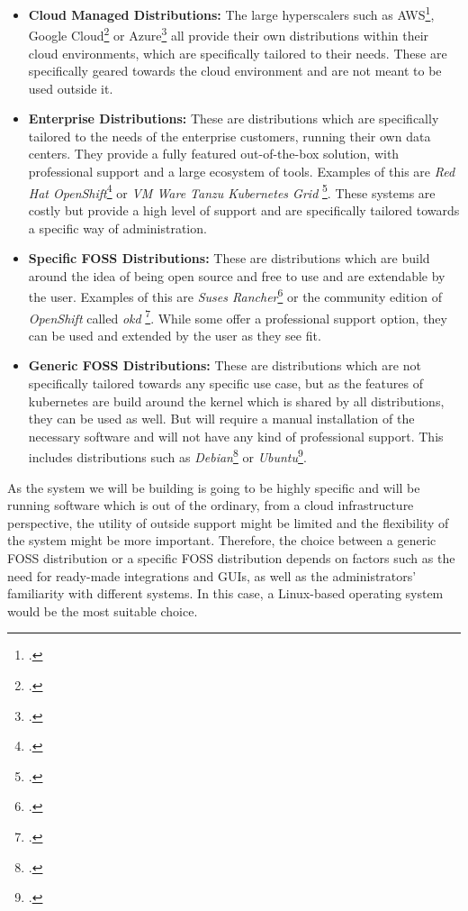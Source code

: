 \begin{itemize}
    \item \textbf{Cloud Managed Distributions:} The large hyperscalers such as AWS\footcite{awsOpenSourceKubernetesVerteilungAmazonEKSVerteilungAmazon}, Google Cloud\footcite{googleNodeImagesGoogle}
          or Azure\footcite{burtMicrosoftAzureLinux} all provide their own distributions within their cloud environments, which are specifically tailored to their needs.
          These are specifically geared towards the cloud environment and are not meant to be used outside it.
    \item \textbf{Enterprise Distributions:} These are distributions which are specifically tailored to the needs of the enterprise customers,
          running their own data centers. They provide a fully featured out-of-the-box solution, with professional support and a large ecosystem of tools.
          Examples of this are \textit{Red Hat OpenShift}\footcite{redhatRedHatOpenShift} or \textit{VM Ware Tanzu Kubernetes Grid} \footcite{vmwareVMwareTanzuKubernetes2020}.
          These systems are costly but provide a high level of support and are specifically tailored towards a specific way of administration.
    \item \textbf{Specific \ac{FOSS} Distributions:} These are distributions which are build around the idea of being open source and free to use
          and are extendable by the user. Examples of this are \textit{Suses Rancher}\footcite{rancherInnovateEverywhere} or the community edition of \textit{OpenShift} called \textit{okd} \footcite{innesOKDIo}.
          While some offer a professional support option, they can be used and extended by the user as they see fit.
    \item \textbf{Generic \ac{FOSS} Distributions:} These are distributions which are not specifically tailored towards any specific use case, but as the features of
          kubernetes are build around the kernel which is shared by all distributions, they can be used as well.
          But will require a manual installation of the necessary software and will not have any kind of professional support. This includes distributions such as \textit{Debian}\footcite{debianDebianUniversalOperating} or \textit{Ubuntu}\footcite{canonicalGetUbuntuServer}.
\end{itemize}

As the system we will be building is going to be highly specific and will be running software which is out of the ordinary,
from a cloud infrastructure perspective, the utility of outside support might be limited and the flexibility of the system might be more important.
Therefore, the choice between a generic \ac{FOSS} distribution or a specific \ac{FOSS} distribution depends on factors such as the need for ready-made integrations and GUIs,
as well as the administrators' familiarity with different systems.
In this case, a Linux-based operating system would be the most suitable choice.

